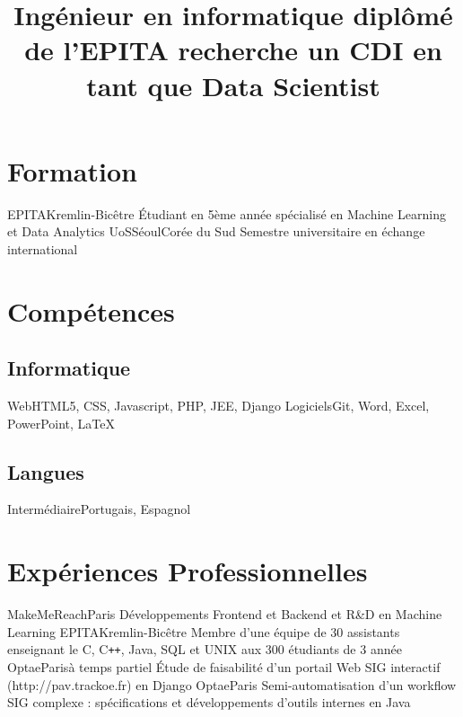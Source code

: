 \documentclass[11pt,a4paper,sans]{moderncv}
\title{Ingénieur en informatique diplômé de l'EPITA recherche un CDI en tant que Data Scientist}
\begin{document}
\makecvtitle

\section{Formation}
	   {EPITA}{Kremlin-Bicêtre}{}
	   {Étudiant en 5ème année spécialisé en Machine Learning et Data Analytics}
	   {UoS}{Séoul}{Corée du Sud}
	   {Semestre universitaire en échange international}

\section{Compétences}
\subsection{Informatique}
		    {Web}{HTML5, CSS, Javascript, PHP, JEE, Django}
		    {Logiciels}{Git, Word, Excel, PowerPoint, \LaTeX}
		    {}{}
\subsection{Langues}
		    {Intermédiaire}{Portugais, Espagnol}

\section{Expériences Professionnelles}
	   {MakeMeReach}{Paris}{}
	   {Développements Frontend et Backend et R\&D en Machine Learning}
	   {EPITA}{Kremlin-Bicêtre}{}
	   {Membre d'une équipe de 30 assistants enseignant le C, C\texttt{++}, Java, SQL et UNIX aux 300 étudiants de 3 année}
	   {Optae}{Paris}{à temps partiel}
	   {Étude de faisabilité d'un portail Web SIG interactif (http://pav.trackoe.fr) en Django}
	   {Optae}{Paris}{}
	   {Semi-automatisation d'un workflow SIG complexe : spécifications et développements d'outils internes en Java}
\end{document}
